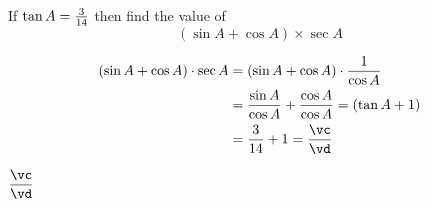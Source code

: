 


\FRACADD\va{}\vc\vd

\question[1]  If $\tan A = \frac{3}{14}$ then find the value of
\[ (\sin A + \cos A)\times\sec A \]

\watchout

\begin{solution}[\mcq]
	\begin{align}
		(\sin A + \cos A)\cdot\sec A &= (\sin A + \cos A)\cdot\dfrac{1}{\cos A} \\
		                             &= \dfrac{\sin A}{\cos A} + \dfrac{\cos A}{\cos A} = (\tan A + 1) \\
		                             &= \dfrac\va\vb + 1 = \dfrac\vc\vd
	\end{align}
\end{solution}
\ifprintanswers\begin{codex}$\dfrac\vc\vd$\end{codex}\fi
